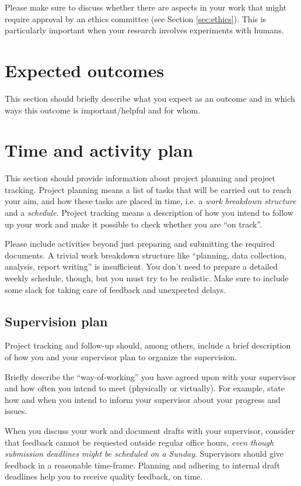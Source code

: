 \documentclass[12pt,a4paper,twoside]{article}
\begin{document}
Please make sure to discuss whether there are aspects in your work that might require
approval by an ethics committee (see Section \ref{sec:ethics}). This is particularly important
when your research involves experiments with humans.


\section{Expected outcomes}
\label{sec:outcome}
This section should briefly describe what you expect as an outcome and in which ways this outcome is important/helpful and for whom. 


\section{Time and activity plan}
\label{sec:plan}
This section should provide information about project planning and project tracking.
Project planning means a list of tasks that will be carried out to reach your aim,
and how these tasks are placed in time, i.e. a \textit{work breakdown structure}
and a \textit{schedule}.
Project tracking means a description of how you intend to follow up your work and make it possible to check whether you are ``on track''.

Please include activities beyond just preparing and submitting the required documents.
A trivial work breakdown structure like ``planning, data collection, analysis,
report writing'' is insufficient. You don't need to prepare a detailed weekly
schedule, though, but you must try to be realistic.
Make sure to include some slack for taking care of feedback and unexpected delays.

\subsection{Supervision plan}
Project tracking and follow-up should, among others, include a brief description of how you and your supervisor plan to organize the supervision.

Briefly describe the ``way-of-working'' you have agreed upon with your supervisor and how often you intend to meet (physically or virtually). For example, state how and when you intend to inform your supervisor about your progress and issues. 

When you discuss your work and document drafts with your supervisor, consider that feedback cannot be requested outside regular office hours, \emph{even though submission deadlines might be scheduled on a Sunday}. Supervisors should give feedback in a reasonable time-frame. Planning and adhering to internal draft deadlines help you to receive quality feedback, on time. 
\end{document}
